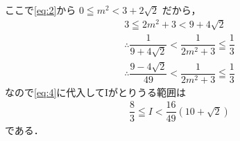 \documentclass[../../main.tex]{subfiles}
\begin{document}
ここで\cref{eq:2}から $0 \leqq m^2 < 3+2\sqrt{2}$ だから，
\begin{align}
  3 \leqq 2m^2+3 < 9+4\sqrt{2} \\
  \therefore \dfrac{1}{9+4\sqrt{2}} < \dfrac{1}{2m^2+3} \leqq \dfrac{1}{3}  \\
  \therefore \dfrac{9-4\sqrt{2}}{49} < \dfrac{1}{2m^2+3} \leqq \dfrac{1}{3}
\end{align}
なので\cref{eq:4}に代入してIがとりうる範囲は
\begin{align}
  \dfrac{8}{3} \leqq I < \dfrac{16}{49}(10+\sqrt{2})
\end{align}
である．
\end{document}
